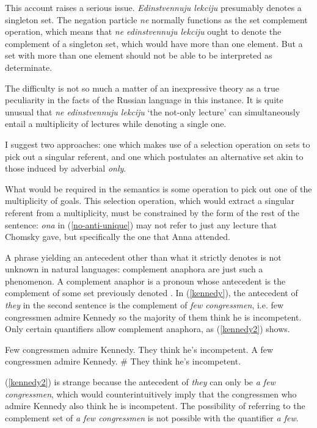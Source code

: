 This account raises a serious issue. \textit{Edinstvennuju lekciju} presumably denotes a singleton set. The negation particle \textit{ne} normally functions as the set complement operation, which means that \textit{ne edinstvennuju lekciju} ought to denote the complement of a singleton set, which would have more than one element. But a set with more than one element should not be able to be interpreted as determinate.

The difficulty is not so much a matter of an inexpressive theory as a true peculiarity in the facts of the Russian language in this instance. It is quite unusual that \textit{ne edinstvennuju lekciju} `the not-only lecture' can simultaneously entail a multiplicity of lectures while denoting a single one.

I suggest two approaches: one which makes use of a selection operation on sets to pick out a singular referent, and one which postulates an alternative set akin to those induced by adverbial \textit{only}.

What would be required in the semantics is some operation to pick out one of the multiplicity of goals. This selection operation, which would extract a singular referent from a multiplicity, must be constrained by the form of the rest of the sentence: \textit{ona} in (\ref{no-anti-unique}) may not refer to just any lecture that Chomsky gave, but specifically the one that Anna attended.

A phrase yielding an antecedent other than what it strictly denotes is not unknown in natural languages: complement anaphora are just such a phenomenon. A complement anaphor is a pronoun whose antecedent is the complement of some set previously denoted \citep{nouwen03, schwarz09}. In (\ref{kennedy}), the antecedent of \textit{they} in the second sentence is the complement of \textit{few congressmen}, i.e. few congressmen admire Kennedy so the majority of them think he is incompetent. Only certain quantifiers allow complement anaphora, as (\ref{kennedy2}) shows.

\begin{exe}
	\ex \label{kennedy} Few congressmen admire Kennedy. They think he's incompetent.
	\ex \label{kennedy2} A few congressmen admire Kennedy. \# They think he's incompetent.
\end{exe}

(\ref{kennedy2}) is strange because the antecedent of \textit{they} can only be \textit{a few congressmen}, which would counterintuitively imply that the congressmen who admire Kennedy also think he is incompetent. The possibility of referring to the complement set of \textit{a few congressmen} is not possible with the quantifier \textit{a few}.

